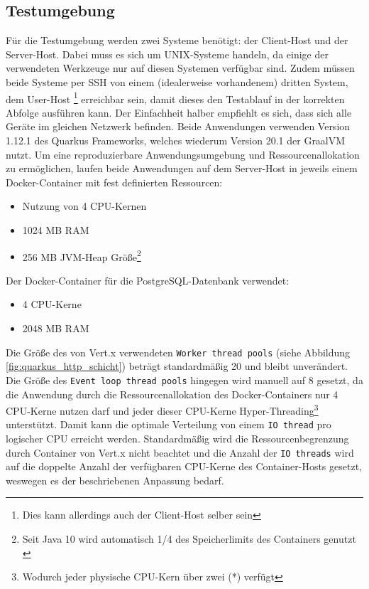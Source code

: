 \subsection{Testumgebung}
\label{section:testumgebung}
Für die Testumgebung werden zwei Systeme benötigt: der Client-Host und der Server-Host.
Dabei muss es sich um UNIX-Systeme handeln, da einige der verwendeten Werkzeuge nur auf diesen Systemen verfügbar sind.
Zudem müssen beide Systeme per SSH von einem (idealerweise vorhandenem) dritten System, dem User-Host
\footnote{Dies kann allerdings auch der Client-Host selber sein}
erreichbar sein, damit dieses den Testablauf in der korrekten Abfolge ausführen kann.
Der Einfachheit halber empfiehlt es sich, dass sich alle Geräte im gleichen Netzwerk befinden.
Beide Anwendungen verwenden Version 1.12.1 des Quarkus Frameworks, welches wiederum Version 20.1 der GraalVM nutzt.
Um eine reproduzierbare Anwendungsumgebung und Ressourcenallokation zu ermöglichen, laufen beide Anwendungen auf dem Server-Host in
jeweils einem Docker-Container mit fest definierten Ressourcen:
\begin{itemize}
  \item Nutzung von 4 CPU-Kernen
  \item 1024 MB RAM
  \item 256 MB JVM-Heap Größe\footnote{Seit Java 10 wird automatisch 1/4 des Speicherlimits des Containers genutzt \parencite{Java10ReleaseNotes}}
\end{itemize}
Der Docker-Container für die PostgreSQL-Datenbank verwendet:
\begin{itemize}
  \item 4 CPU-Kerne
  \item 2048 MB RAM
\end{itemize}

Die Größe des von Vert.x verwendeten \verb|Worker thread pools| (siehe Abbildung \ref{fig:quarkus_http_schicht}) beträgt standardmäßig 20 und bleibt
unverändert. Die Größe des \verb|Event loop thread pools| hingegen wird manuell auf 8 gesetzt, da die Anwendung durch die Ressourcenallokation
des Docker-Containers nur 4 CPU-Kerne nutzen darf und jeder dieser CPU-Kerne Hyper-Threading\footnote{Wodurch jeder physische CPU-Kern über
  zwei (*) verfügt} unterstützt.
Damit kann die optimale Verteilung von einem \verb|IO thread| pro logischer CPU erreicht werden.
Standardmäßig wird die Ressourcenbegrenzung durch Container von Vert.x nicht beachtet und die Anzahl der \verb|IO threads| wird auf die doppelte
Anzahl der verfügbaren CPU-Kerne des Container-Hosts gesetzt, weswegen es der beschriebenen Anpassung bedarf.

